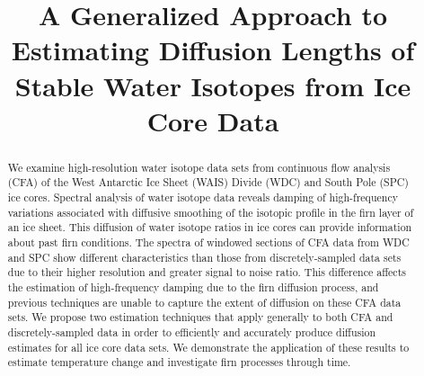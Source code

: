 \documentclass[draft, jgrga]{AGUTeX}
\begin{document}

\title{A Generalized Approach to Estimating Diffusion Lengths of Stable Water Isotopes from Ice Core Data}









\begin{abstract}

We examine high-resolution water isotope data sets from continuous flow analysis (CFA) of the West Antarctic Ice Sheet (WAIS) Divide (WDC) and South Pole (SPC) ice cores. Spectral analysis of water isotope data reveals damping of high-frequency variations associated with diffusive smoothing of the isotopic profile in the firn layer of an ice sheet. This diffusion of water isotope ratios in ice cores can provide information about past firn conditions. The spectra of windowed sections of CFA data from WDC and SPC show different characteristics than those from discretely-sampled data sets due to their higher resolution and greater signal to noise ratio. This difference affects the estimation of high-frequency damping due to the firn diffusion process, and previous techniques are unable to capture the extent of diffusion on these CFA data sets. We propose two estimation techniques that apply generally to both CFA and discretely-sampled data in order to efficiently and accurately produce diffusion estimates for all ice core data sets. We demonstrate the application of these results to estimate temperature change and investigate firn processes through time.

\end{abstract}
\end{document}
